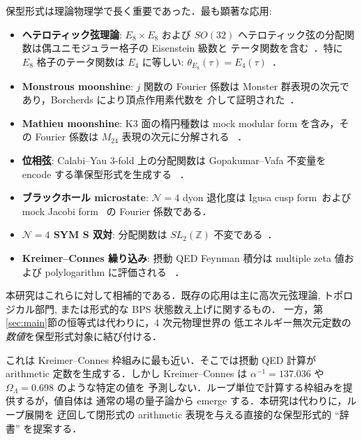 \documentclass[11pt,a4paper]{article}
\begin{document}
保型形式は理論物理学で長く重要であった．最も顕著な応用:

\begin{itemize}
\item \textbf{ヘテロティック弦理論}: $E_8 \times E_8$ および $SO(32)$
ヘテロティック弦の分配関数は偶ユニモジュラー格子の Eisenstein 級数と
テータ関数を含む~\cite{GSW1987}．特に $E_8$ 格子のテータ関数は
$E_4$ に等しい: $\theta_{E_8}(\tau) = E_4(\tau)$~\cite{Serre1973}．

\item \textbf{Monstrous moonshine}: $j$ 関数の Fourier 係数は
Monster 群表現の次元であり，Borcherds により頂点作用素代数を
介して証明された~\cite{Borcherds1992}．

\item \textbf{Mathieu moonshine}: K3 面の楕円種数は mock modular
form を含み，その Fourier 係数は $M_{24}$ 表現の次元に分解される
~\cite{EOT2010,Gannon2016}．

\item \textbf{位相弦}: Calabi--Yau 3-fold 上の分配関数は
Gopakumar--Vafa 不変量を encode する準保型形式を生成する
~\cite{GV1998,BCOV1994}．

\item \textbf{ブラックホール microstate}: $\mathcal{N}=4$ dyon 退化度は
Igusa cusp form~\cite{DMVV1997}および mock Jacobi form~\cite{Dabholkar2012}
の Fourier 係数である．

\item \textbf{$\mathcal{N}=4$ SYM S 双対}: 分配関数は
$SL_2(\mathbb{Z})$ 不変である~\cite{VafaWitten1994}．

\item \textbf{Kreimer--Connes 繰り込み}: 摂動 QED Feynman 積分は
multiple zeta 値および polylogarithm に評価される
~\cite{Kreimer1997,ConnesKreimer2000,Brown2015}．
\end{itemize}

本研究はこれらに対して相補的である．既存の応用は主に高次元弦理論,
トポロジカル部門, または形式的な BPS 状態数え上げに関するもの．
一方，第 \ref{sec:main}節の恒等式は代わりに，4 次元物理世界の
低エネルギー無次元定数の\emph{数値}を保型形式対象に結び付ける．

これは Kreimer--Connes 枠組みに最も近い．そこでは摂動 QED 計算が
arithmetic 定数を生成する．しかし Kreimer--Connes は
$\alpha^{-1} = 137.036$ や $\Omega_\Lambda = 0.698$ のような特定の値を
予測しない．ループ単位で計算する枠組みを提供するが，値自体は
通常の場の量子論から emerge する．本研究は代わりに，ループ展開を
迂回して閉形式の arithmetic 表現を与える直接的な保型形式的
``辞書'' を提案する．
\end{document}
